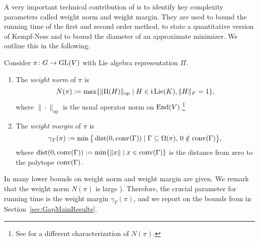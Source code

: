 A very important technical contribution of \cite{GradflowArXiv} is to identify key complexity parameters called weight norm and weight margin. They are used to bound the running time of the first and second order method, to state a quantitative version of Kempf-Ness and to bound the diameter of an approximate minimizer. We outline this in the following.

\begin{defn}\label{defn:WeightNormAndMargin}
	Consider $\pi \colon G \to \operatorname{GL}(V)$ with Lie algebra representation $\Pi$.
	\begin{enumerate}
		\item \cite[Definition~3.10]{GradflowArXiv} The \emph{weight norm} of $\pi$ is
			\[ N(\pi) := \max \{ \|\Pi(H)\|_{\text{op}} \mid H \in \mathfrak{i} \operatorname{Lie}(K), \|H\|_F = 1  \}, \]
		where $\| \cdot \|_{\text{op}}$ is the usual operator norm on $\operatorname{End}(V)$.\footnote{See \cite[Proposition~3.11]{GradflowArXiv} for a different characterization of $N(\pi)$.}
		
		\item \cite[Definition~3.18]{GradflowArXiv} The \emph{weight margin} of $\pi$ is
			\[ \gamma_T(\pi) := \min \big\{ \operatorname{dist}(0, \operatorname{conv}(\Gamma)) \mid \Gamma \subseteq \Omega(\pi), \, 0 \notin \operatorname{conv}(\Gamma) \big\} , \]
		where $\operatorname{dist}(0, \operatorname{conv}(\Gamma)) := \min \{\|x\| \mid x \in \operatorname{conv}(\Gamma)\}$ is the distance from zero to the polytope $\operatorname{conv}(\Gamma)$. \hfill{}
	\end{enumerate}
\end{defn}

In \cite[Section~6]{GradflowArXiv} many lower bounds on weight norm and weight margin are given. We remark that the weight norm $N(\pi)$ is large \cite[Lemma~6.1 and Example~6.3]{GradflowArXiv}). Therefore, the crucial parameter for running time is the weight margin $\gamma_T(\pi)$, and we report on the bounds from \cite{GradflowArXiv} in Section~\ref{sec:GapMainResults}.

